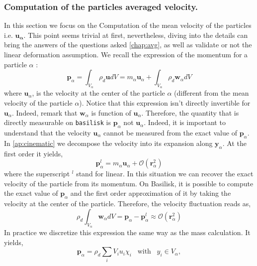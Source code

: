 \subsubsection*{Computation of the particles averaged velocity.}
In this section we focus on the Computation of the mean velocity of the particles i.e. $\bm{u_\alpha}$. 
This point seems trivial at first, nevertheless, diving into the details can bring the answers of the questions asked \ref{chap:avg}, as well as validate or not the linear deformation assumption. 
We recall the expression of the momentum for a particle $\alpha$ :
\begin{equation}
    \bm{p}_\alpha 
    = \int_{V_\alpha} \rho_d \bm{u} dV
    = m_\alpha \bm{u}_\alpha 
    + \int_{V_\alpha} \rho_d \bm{w}_\alpha dV
\end{equation}
where $\bm{u}_\alpha$, is the velocity at the center of the particle $\alpha$ (different from the mean velocity of the particle $\alpha$). 
Notice that this expression isn't directly invertible for $\bm{u}_\alpha$. 
Indeed, remark that $\bm{w}_\alpha$ is function of $\bm{u}_\alpha$.
Therefore, the quantity that is directly measurable on \texttt{basilisk} is $\bm{p}_\alpha$ not $\bm{u}_\alpha$. 
Indeed, it is important to understand that the velocity $\bm{u}_\alpha$ cannot be measured from the exact value of $\bm{p}_\alpha$.
In \ref{ap:cinematic} we decompose the velocity into its expansion along $\bm{y}_\alpha$. 
At the first order it yields, 
\begin{equation}
    \bm{p}_\alpha^l 
    = m_\alpha \bm{u}_\alpha + \mathcal{O}(\bm{r}_\alpha^2)
\end{equation}
where the superscript $^l$ stand for linear. 
In this situation we can recover the exact velocity of the particle from its momentum. 
On Basilisk, it is possible to compute the exact value of $\bm{p}_\alpha$ and the first order approximation of it by taking the velocity at the center of the particle. 
Therefore, the velocity fluctuation reads as, 
\begin{equation}
    \rho_d \int_{V_\alpha} \bm{w}_\alpha dV
    = \bm{p}_\alpha -\bm{p}_\alpha^l
    \approx \mathcal{O}(\bm{r}_\alpha^2)
\end{equation}
In practice we discretize this expression the same way as the mass calculation.
It yields, 
\begin{equation}
    \bm{p}_\alpha = \rho_d\sum_{i} V_i u_i \chi_i \;\;\; \text{with} \;\;\;y_i \in V_\alpha,
\end{equation}
